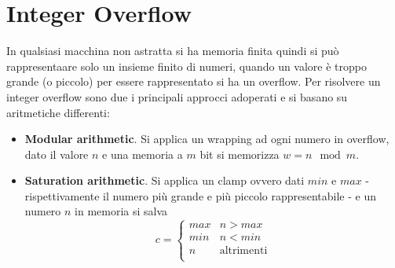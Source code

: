 \documentclass[Lau,binding=0.6cm]{sapthesis}
\begin{document}

\section{Integer Overflow} \label{sec:integer_overflow}
In qualsiasi macchina non astratta si ha memoria finita quindi si può rappresentaare solo un insieme finito di numeri, quando un valore è troppo grande (o piccolo) per essere rappresentato si ha un overflow.
Per risolvere un integer overflow sono due i principali approcci adoperati e si basano su aritmetiche differenti:
\begin{itemize}
    \item \textbf{Modular arithmetic}. Si applica un wrapping ad ogni numero in overflow, dato il valore $ n $ e una memoria a $ m $ bit si memorizza $ w = n \mod m $.
    \item \textbf{Saturation arithmetic}. Si applica un clamp ovvero dati $ min $ e $ max $ - rispettivamente il numero più grande e più piccolo rappresentabile - e un numero $ n $ in memoria si salva
    \begin{equation*}
        c = \begin{cases}
            max & n > max \\
            min & n < min \\
            n  & \text{altrimenti} \\
        \end{cases}
    \end{equation*}
\end{itemize}
\end{document}
